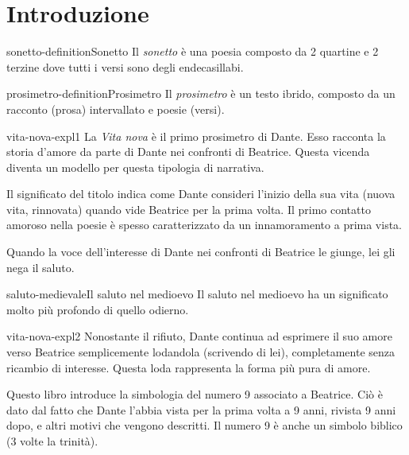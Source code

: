 \documentclass[preview]{standalone}
\begin{document}
\genpage

\section{Introduzione}

\begin{snippetdefinition}{sonetto-definition}{Sonetto}
    Il \textit{sonetto} è una poesia composto da 2 quartine e 2 terzine dove tutti i versi sono degli endecasillabi.
\end{snippetdefinition}

\begin{snippetdefinition}{prosimetro-definition}{Prosimetro}
    Il \textit{prosimetro} è un testo ibrido, composto da un
    racconto (prosa) intervallato e poesie (versi).
\end{snippetdefinition}

\begin{snippet}{vita-nova-expl1}
    La \textit{Vita nova} è il primo prosimetro di Dante. Esso racconta la storia d'amore da parte di Dante
    nei confronti di Beatrice.
    Questa vicenda diventa un modello per questa tipologia di narrativa.
    
    Il significato del titolo indica come Dante consideri l'inizio della sua vita (nuova vita, rinnovata)
    quando vide Beatrice per la prima volta.
    Il primo contatto amoroso nella poesie è spesso caratterizzato da un innamoramento a prima vista.
    
    Quando la voce dell'interesse di Dante nei confronti di Beatrice le giunge, lei gli nega il saluto.
\end{snippet}

\begin{snippetnote}{saluto-medievale}{Il saluto nel medioevo}
    Il saluto nel medioevo ha un significato molto più profondo di quello odierno.
\end{snippetnote}

\begin{snippet}{vita-nova-expl2}
    Nonostante il rifiuto, Dante continua ad esprimere il suo amore verso Beatrice semplicemente
    lodandola (scrivendo di lei), completamente senza ricambio di interesse.
    Questa loda rappresenta la forma più pura di amore.
    
    Questo libro introduce la simbologia del numero 9 associato a Beatrice.
    Ciò è dato dal fatto che Dante l'abbia vista per la prima volta a 9 anni, rivista 9 anni dopo,
    e altri motivi che vengono descritti. Il numero 9 è anche un simbolo biblico (3 volte la trinità).
\end{snippet}
\end{document}
